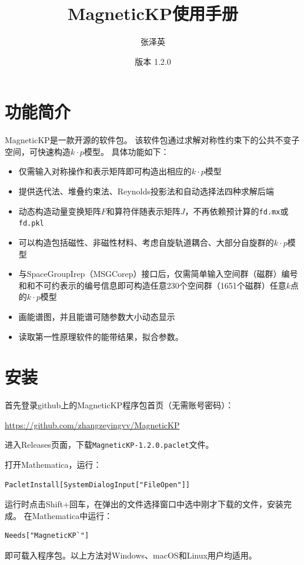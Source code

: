 \documentclass[titlepage,a4paper,12pt,AutoFakeBold]{article}
\begin{document}
\title{\textsf{MagneticKP}使用手册}
\author{张泽英}
\date{版本 1.2.0}

\maketitle


\tableofcontents

\newpage

\section{功能简介}
\textsf{MagneticKP}是一款开源的软件包。
该软件包通过求解对称性约束下的公共不变子空间，可快速构造$k\cdot p$模型。
具体功能如下：
\begin{itemize}
\item   仅需输入对称操作和表示矩阵即可构造出相应的$k\cdot p$模型
\item   提供迭代法、堆叠约束法、Reynolds投影法和自动选择法四种求解后端
\item   动态构造动量变换矩阵$F$和算符伴随表示矩阵$J$，不再依赖预计算的\lstinline|fd.mx|或\lstinline|fd.pkl|
\item	可以构造包括磁性、非磁性材料、考虑自旋轨道耦合、大部分自旋群的$k\cdot p$模型
\item	与\textsf{SpaceGroupIrep}（\textsf{MSGCorep}）接口后，仅需简单输入空间群（磁群）编号和和不可约表示的编号信息即可构造任意230个空间群（1651个磁群）任意$k$点的$k\cdot p$模型
\item	画能谱图，并且能谱可随参数大小动态显示
\item	读取第一性原理软件的能带结果，拟合参数。
\end{itemize}


\section{安装}

首先登录github上的\textsf{MagneticKP}程序包首页（无需账号密码）：
\begin{center}
\url{https://github.com/zhangzeyingvv/MagneticKP}
\end{center}
进入Releases页面，下载\lstinline|MagneticKP-1.2.0.paclet|文件。

打开Mathematica，运行：
\begin{lstlisting}[numbers=none]
PacletInstall[SystemDialogInput["FileOpen"]]
\end{lstlisting}
运行时点击Shift+回车，在弹出的文件选择窗口中选中刚才下载的文件，安装完成。
在Mathematica中运行：
\begin{lstlisting}[numbers=none]
Needs["MagneticKP`"]
\end{lstlisting}
即可载入程序包。以上方法对Windows、macOS和Linux用户均适用。
\end{document}
